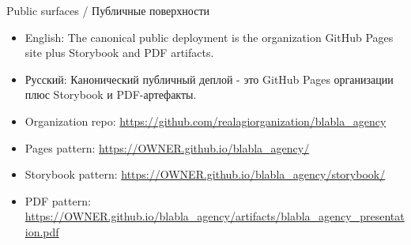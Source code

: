 \documentclass[aspectratio=169]{beamer}
\begin{document}
\begin{frame}{Public surfaces / Публичные поверхности}
  \small
  \begin{itemize}
    \item English: The canonical public deployment is the organization GitHub Pages site plus Storybook and PDF artifacts.
    \item Русский: Канонический публичный деплой - это GitHub Pages организации плюс Storybook и PDF-артефакты.
    \item Organization repo: \url{https://github.com/realagiorganization/blabla_agency}
    \item Pages pattern: \url{https://OWNER.github.io/blabla_agency/}
    \item Storybook pattern: \url{https://OWNER.github.io/blabla_agency/storybook/}
    \item PDF pattern: \url{https://OWNER.github.io/blabla_agency/artifacts/blabla_agency_presentation.pdf}
  \end{itemize}
\end{frame}
\end{document}
